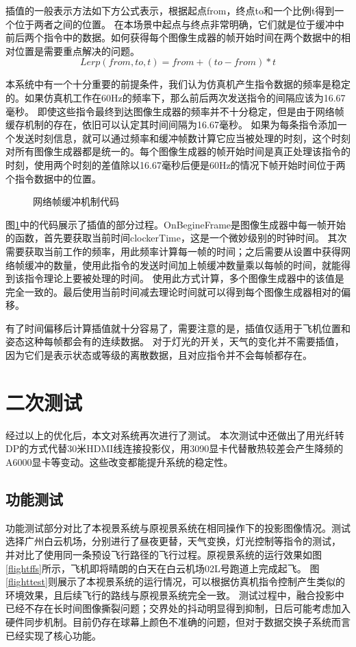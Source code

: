 \par
插值的一般表示方法如下方公式表示，根据起点from，终点to和一个比例t得到一个位于两者之间的位置。
在本场景中起点与终点非常明确，它们就是位于缓冲中前后两个指令中的数据。如何获得每个图像生成器的帧开始时间在两个数据中的相对位置是需要重点解决的问题。
$$Lerp(from,to,t)=from+(to-from)*t$$
\par
本系统中有一个十分重要的前提条件，我们认为仿真机产生指令数据的频率是稳定的。如果仿真机工作在60Hz的频率下，那么前后两次发送指令的间隔应该为16.67毫秒。
即使这些指令最终到达图像生成器的频率并不十分稳定，但是由于网络帧缓存机制的存在，依旧可以认定其时间间隔为16.67毫秒。
如果为每条指令添加一个发送时刻信息，就可以通过频率和缓冲帧数计算它应当被处理的时刻，这个时刻对所有图像生成器都是统一的。每个图像生成器的帧开始时间是真正处理该指令的时刻，使用两个时刻的差值除以16.67毫秒后便是60Hz的情况下帧开始时间位于两个指令数据中的位置。
\begin{figure}[h!]
    \centering
     
    \caption{网络帧缓冲机制代码}
    \label{lerpcode}
\end{figure}
\par
图\ref{lerpcode}中的代码展示了插值的部分过程。OnBegineFrame是图像生成器中每一帧开始的函数，首先要获取当前时间clockerTime，这是一个微妙级别的时钟时间。
其次需要获取当前工作的频率，用此频率计算每一帧的时间；之后需要从设置中获得网络帧缓冲的数量，使用此指令的发送时间加上帧缓冲数量乘以每帧的时间，就能得到该指令理论上要被处理的时间。
使用此方式计算，多个图像生成器中的该值是完全一致的。最后使用当前时间减去理论时间就可以得到每个图像生成器相对的偏移。
\par
有了时间偏移后计算插值就十分容易了，需要注意的是，插值仅适用于飞机位置和姿态这种每帧都会有的连续数据。
对于灯光的开关，天气的变化并不需要插值，因为它们是表示状态或等级的离散数据，且对应指令并不会每帧都存在。

\section{二次测试}
经过以上的优化后，本文对系统再次进行了测试。
本次测试中还做出了用光纤转DP的方式代替30米HDMI线连接投影仪，用3090显卡代替散热较差会产生降频的A6000显卡等变动。这些改变都能提升系统的稳定性。
\subsection{功能测试}
功能测试部分对比了本视景系统与原视景系统在相同操作下的投影图像情况。测试选择广州白云机场，分别进行了昼夜更替，天气变换，灯光控制等指令的测试，
并对比了使用同一条预设飞行路径的飞行过程。原视景系统的运行效果如图\ref{flightffs}所示，飞机即将晴朗的白天在白云机场02L号跑道上完成起飞。
图\ref{flighttest}则展示了本视景系统的运行情况，可以根据仿真机指令控制产生类似的环境效果，且后续飞行的路线与原视景系统完全一致。
测试过程中，融合投影中已经不存在长时间图像撕裂问题；交界处的抖动明显得到抑制，日后可能考虑加入硬件同步机制。目前仍存在球幕上颜色不准确的问题，但对于数据交换子系统而言已经实现了核心功能。

